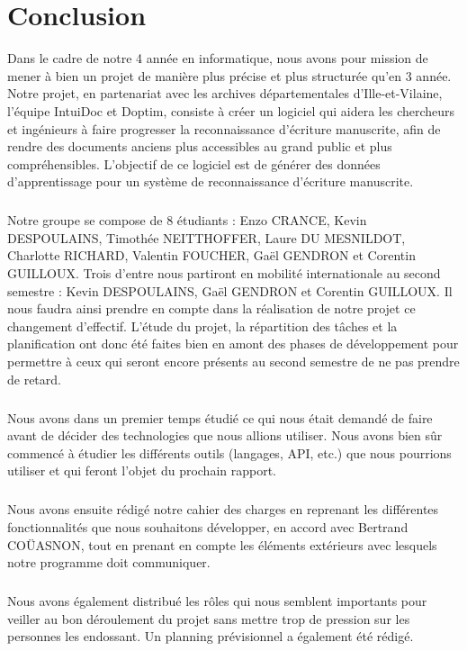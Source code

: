 \chapter{Conclusion}

Dans le cadre de notre 4 année en informatique, nous avons pour mission de
mener à bien un projet de manière plus précise et plus structurée qu’en 3 année.
Notre projet, en partenariat avec les archives départementales d’Ille-et-Vilaine,
l’équipe IntuiDoc et Doptim, consiste à créer un logiciel qui aidera les chercheurs et
ingénieurs à faire progresser la reconnaissance d’écriture manuscrite, afin de rendre
des documents anciens plus accessibles au grand public et plus compréhensibles. L’objectif
de ce logiciel est de générer des données d’apprentissage pour un système de reconnaissance
d’écriture manuscrite.

\paragraph{}
Notre groupe se compose de 8 étudiants : Enzo CRANCE, Kevin DESPOULAINS, Timothée NEITTHOFFER,
Laure DU MESNILDOT, Charlotte RICHARD, Valentin FOUCHER, Gaël GENDRON et Corentin GUILLOUX.
Trois d’entre nous partiront en mobilité internationale au second semestre : Kevin DESPOULAINS,
Gaël GENDRON et Corentin GUILLOUX. Il nous faudra ainsi prendre en compte dans la réalisation
de notre projet ce changement d’effectif. L’étude du projet, la répartition des tâches et la
planification ont donc été faites bien en amont des phases de développement pour permettre à
ceux qui seront encore présents au second semestre de ne pas prendre de retard.

\paragraph{}
Nous avons dans un premier temps étudié ce qui nous était demandé de faire avant de
décider des technologies que nous allions utiliser. Nous avons bien sûr commencé à
étudier les différents outils (langages, API, etc.) que nous pourrions utiliser et qui
feront l’objet du prochain rapport.

\paragraph{}
Nous avons ensuite rédigé notre cahier des charges en reprenant les différentes fonctionnalités
que nous souhaitons développer, en accord avec Bertrand COÜASNON, tout en prenant en compte
les éléments extérieurs avec lesquels notre programme doit communiquer.

\paragraph{}
Nous avons également distribué les rôles qui nous semblent importants pour veiller au bon
déroulement du projet sans mettre trop de pression sur les personnes les endossant.
Un planning prévisionnel a également été rédigé.